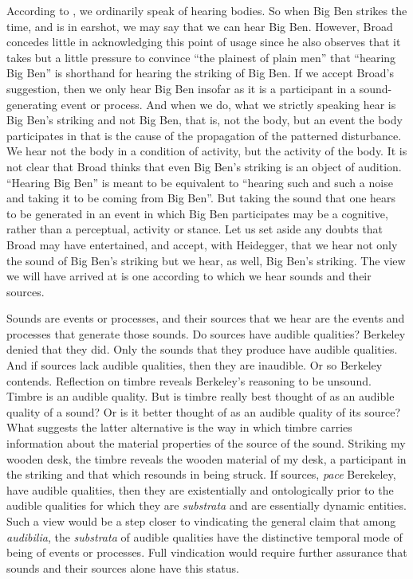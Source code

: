 According to \citet[4]{Broad:1952kx}, we ordinarily speak of hearing bodies. So when Big Ben strikes the time, and is in earshot, we may say that we can hear Big Ben. However, Broad concedes little in acknowledging this point of usage since he also observes that it takes but a little pressure to convince ``the plainest of plain men'' that ``hearing Big Ben'' is shorthand for hearing the striking of Big Ben. If we accept Broad's suggestion, then we only hear Big Ben insofar as it is a participant in a sound-generating event or process. And when we do, what we strictly speaking hear is Big Ben's striking and not Big Ben, that is, not the body, but an event the body participates in that is the cause of the propagation of the patterned disturbance. We hear not the body in a condition of activity, but the activity of the body. It is not clear that Broad thinks that even Big Ben's striking is an object of audition. ``Hearing Big Ben'' is meant to be equivalent to ``hearing such and such a noise and taking it to be coming from Big Ben''. But taking the sound that one hears to be generated in an event in which Big Ben participates may be a cognitive, rather than a perceptual, activity or stance. Let us set aside any doubts that Broad may have entertained, and accept, with Heidegger, that we hear not only the sound of Big Ben's striking but we hear, as well, Big Ben's striking. The view we will have arrived at is one according to which we hear sounds and their sources. 

Sounds are events or processes, and their sources that we hear are the events and processes that generate those sounds. Do sources have audible qualities? Berkeley denied that they did. Only the sounds that they produce have audible qualities. And if sources lack audible qualities, then they are inaudible. Or so Berkeley contends. Reflection on timbre reveals Berkeley's reasoning to be unsound. Timbre is an audible quality. But is timbre really best thought of as an audible quality of a sound? Or is it better thought of as an audible quality of its source? What suggests the latter alternative is the way in which timbre carries information about the material properties of the source of the sound. Striking my wooden desk, the timbre reveals the wooden material of my desk, a participant in the striking and that which resounds in being struck. If sources, \emph{pace} Berekeley, have audible qualities, then they are existentially and ontologically prior to the audible qualities for which they are \emph{substrata} and are essentially dynamic entities. Such a view would be a step closer to vindicating the general claim that among \emph{audibilia}, the \emph{substrata} of audible qualities have the distinctive temporal mode of being of events or processes. Full vindication would require further assurance that sounds and their sources alone have this status.

